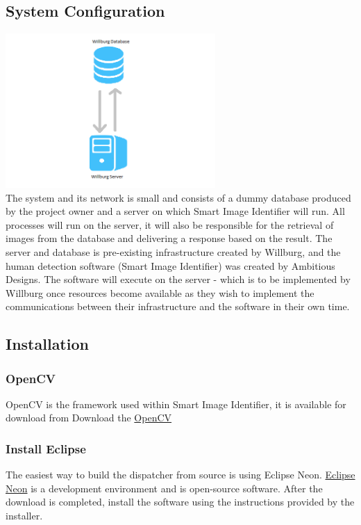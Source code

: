\documentclass[a4paper,12pt]{report}
\begin{document}
\subsection{System Configuration}
\includegraphics[width=8cm]{System.png}\\
 The system and its network is small and consists of a dummy database produced by the project owner and a server on which Smart Image Identifier will run. \linebreak
 All processes will run on the server, it will also be responsible for the retrieval of images from the database and delivering a response based on the result.
 \linebreak \linebreak
 The server and database is pre-existing infrastructure created by Willburg, and the human detection software (Smart Image Identifier) was created by Ambitious Designs. The software will execute on the server - which is to be implemented by Willburg once resources become available as they wish to implement the communications between their infrastructure and the software in their own time.
 
\subsection{Installation}
	\subsubsection{OpenCV}
	OpenCV is the framework used within Smart Image Identifier, it is available for download from 
	Download the
	\href{http://opencv.org/downloads.html}{OpenCV}
	\subsubsection{Install Eclipse}
	The easiest way to build the dispatcher from source is using Eclipse Neon. \href{https://www.eclipse.org/downloads/}{Eclipse Neon}
	 is a
	development environment and is open-source software. After the download is completed, install
	the software using the instructions provided by the installer.
	
\end{document}

